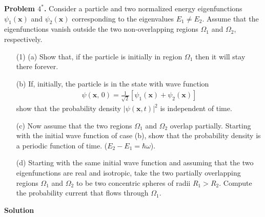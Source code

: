 \documentclass[floatfix,nofootinbib,superscriptaddress,fleqn]{revtex4}
\begin{document}
\noindent \textbf{Problem $4^*$.}
Consider a particle and two normalized energy eigenfunctions
$\psi_1(\bm{x})$ and $\psi_2(\bm{x})$ corresponding to the eigenvalues
$E_1\neq E_2$. Assume that the eigenfunctions vanish outside the two 
non-overlapping regions $\Omega_1$ and $\Omega_2$, respectively. 
\begin{itemize}
\item[(1)] (a) Show that, if the particle is initially in region
  $\Omega_1$ then it will stay there forever. 
\item[(b)] If, initially, the particle is in the state with wave function
\begin{align*}
  \psi(\bm{x},\,0) = \frac1{\sqrt{2}} [\psi_1(\bm{x}) +
  \psi_2(\bm{x})] 
\end{align*}
show that the probability density $|\psi(\bm{x},t)|^2$ is independent
of time. 
\item[(c)] Now assume that the two regions $\Omega_1$ and $\Omega_2$
  overlap partially. Starting with the initial wave function of case
  (b), show that the probability density is a periodic function of 
time. ($E_2-E_1=\hbar \omega$).
\item[(d)] Starting with the same initial wave function and assuming
  that the two eigenfunctions are real and isotropic, take the two
  partially overlapping regions $\Omega_1$ and $\Omega_2$ to be 
two concentric spheres of radii $R_1>R_2$. Compute the probability
current that flows through $\Omega_1$.
\end{itemize}
\noindent \textbf{Solution}
\end{document}
